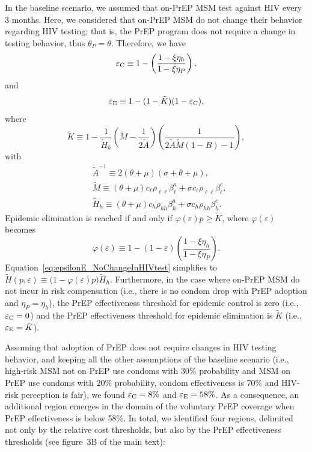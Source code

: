\documentclass[11pt]{article}
\begin{document}
In the baseline scenario, we assumed that on-PrEP MSM test against HIV every 3 months. Here, we considered that on-PrEP MSM do not change their behavior regarding HIV testing; that is, the PrEP program does not require a change in testing behavior, thus $\theta_P=\theta$. Therefore, we have
\begin{equation}
	\varepsilon_{\rm C} \equiv 1- \left(\frac{ 1-\xi \eta_h}{1-\xi \eta_P} \right),
\end{equation}
and
\begin{equation} \label{eq:epsilonE_NoChangeInHIVtest}
	\varepsilon_{\rm E} \equiv 1-(1-\tilde K)(1-\varepsilon_{\rm C}),
\end{equation}
where
\begin{equation}
	\tilde K \equiv 1 - \frac{1}{\tilde{H}_h} \left(\tilde{M} - \frac{1}{2\tilde{A}}\right) \left(\frac{1}{2\tilde{A}\tilde{M} (1-B) -1}\right),
\end{equation}
with
\begin{align}
	& \tilde{A}^{-1} \equiv 2 (\theta+\mu) (\sigma+\theta+\mu),\\
	& \tilde{M} \equiv (\theta+\mu) c_\ell \rho_{\ell \ell}\beta_\ell^a+\sigma c_\ell \rho_{\ell \ell}\beta_\ell^c,\\
	& \tilde{H}_h\equiv (\theta+\mu) c_h \rho_{hh} \beta_h^a + \sigma c_h \rho_{hh} \beta_h^c.
\end{align}
Epidemic elimination is reached if and only if $\varphi(\varepsilon) p \geq \tilde K$, where $\varphi(\varepsilon)$ becomes
\begin{equation}
	\varphi(\varepsilon) \equiv 1 - (1-\varepsilon) \left( \frac{1-\xi \eta_h}{1-\xi \eta_P}\right).
\end{equation}
Equation~\eqref{eq:epsilonE_NoChangeInHIVtest} simplifies to $\tilde{H}(p,\varepsilon) \equiv \big(1-\varphi(\varepsilon) p\big) \tilde{H}_h$. Furthermore, in the case where on-PrEP MSM do not incur in risk compensation (i.e., there is no condom drop with PrEP adoption and $\eta_P=\eta_h$), the PrEP effectiveness threshold for epidemic control is zero (i.e., $\varepsilon_{\rm C}=0$) and the PrEP effectiveness threshold for epidemic elimination is $\tilde K$ (i.e., $\varepsilon_{\rm E}=\tilde K$).

Assuming that adoption of PrEP does not require changes in HIV testing behavior, and keeping all the other assumptions of the baseline scenario (i.e., high-risk MSM not on PrEP use condoms with $30\%$ probability and MSM on PrEP use condoms with $20\%$ probability, condom effectiveness is $70\%$ and HIV-risk perception is fair), we found $\varepsilon_{\rm C}=8\%$ and $\varepsilon_{\rm E}=58\%$. As a consequence, an additional region emerges in the domain of the voluntary PrEP coverage when PrEP effectiveness is below 58\%. In total, we identified four regions, delimited not only by the relative cost thresholds, but also by the PrEP effectiveness thresholds (see figure~3B of the main text):
\end{document}
